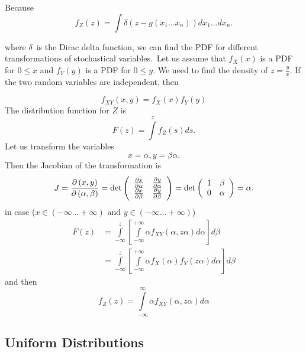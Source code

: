 \documentclass[titlepage,fleqn]{article}%
\begin{document}
Because
\[
f_{Z}(z)=%
{\displaystyle\int}
\delta\left(  z-g(x_{1}\ldots x_{n})\right)  dx_{1}\ldots dx_{n}.
\]
\bigskip

\noindent where $\delta$\ is the Dirac delta function, we can find the PDF for
different transformations of stochastical variables.\ Let us assume that
$f_{X}(x)$ is a PDF for $0\leq x$ and $f_{Y}(y)$ is a PDF for $0\leq y$. We
need to find the density of $z=\frac{y}{x}$. If the two random variables are
independent, then%

\[
f_{XY}(x,y)=f_{X}(x)f_{Y}(y)
\]
The distribution function for $Z$ is%
\[
F(z)=%
{\displaystyle\int\limits^{z}}
f_{Z}(s)ds.
\]
Let us transform the variables%
\[
x=\alpha,y=\beta\alpha.
\]
Then the Jacobian of the transformation is%
\[
J=\frac{\partial\left(  x,y\right)  }{\partial\left(  \alpha,\beta\right)
}=\det\left(
\begin{array}
[c]{cc}%
\frac{\partial x}{\partial\alpha} & \frac{\partial y}{\partial\alpha}\\
\frac{\partial x}{\partial\beta} & \frac{\partial y}{\partial\beta}%
\end{array}
\right)  =\det\left(
\begin{array}
[c]{cc}%
1 & \beta\\
0 & \alpha
\end{array}
\right)  =\alpha.
\]
in case ($x\in(-\infty\ldots+\infty)$ and $y\in(-\infty\ldots+\infty) $)
\begin{align*}
F(z)  &  =%
{\displaystyle\int\limits_{-\infty}^{z}}
\left[
{\displaystyle\int\limits_{-\infty}^{+\infty}}
\alpha f_{XY}(\alpha,z\alpha)d\alpha\right]  d\beta\\
&  =%
{\displaystyle\int\limits_{-\infty}^{z}}
\left[
{\displaystyle\int\limits_{-\infty}^{+\infty}}
\alpha f_{X}(\alpha)f_{Y}(z\alpha)d\alpha\right]  d\beta
\end{align*}
and then%
\[
f_{Z}(z)=%
{\displaystyle\int\limits_{-\infty}^{\infty}}
\alpha f_{XY}(\alpha,z\alpha)d\alpha
\]


\subsection{Uniform Distributions}%
\end{document}
